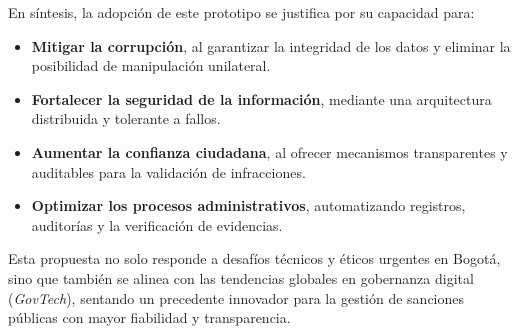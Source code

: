 En síntesis, la adopción de este prototipo se justifica por su capacidad para:
\begin{itemize}
\item \textbf{Mitigar la corrupción}, al garantizar la integridad de los datos y eliminar la posibilidad de manipulación unilateral.
\item \textbf{Fortalecer la seguridad de la información}, mediante una arquitectura distribuida y tolerante a fallos.
\item \textbf{Aumentar la confianza ciudadana}, al ofrecer mecanismos transparentes y auditables para la validación de infracciones.
\item \textbf{Optimizar los procesos administrativos}, automatizando registros, auditorías y la verificación de evidencias.
\end{itemize}

Esta propuesta no solo responde a desafíos técnicos y éticos urgentes en Bogotá, sino que también se alinea con las tendencias globales en gobernanza digital (\textit{GovTech}), sentando un precedente innovador para la gestión de sanciones públicas con mayor fiabilidad y transparencia.